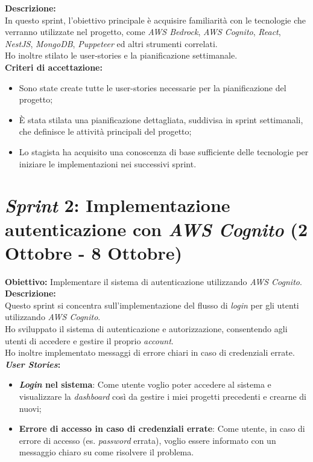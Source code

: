\noindent \textbf{Descrizione:}\\  
\noindent In questo \gls{sprint}, l'obiettivo principale è acquisire familiarità con le tecnologie che verranno utilizzate nel progetto, come \textit{AWS Bedrock}, \textit{AWS Cognito}, \textit{React}, \textit{NestJS}, \textit{MongoDB}, \textit{Puppeteer} ed altri strumenti correlati.\\
Ho inoltre stilato le \gls{user-stories} e la pianificazione settimanale.\\

\noindent \textbf{Criteri di accettazione:}  
\begin{itemize}
    \item Sono state create tutte le \gls{user-stories} necessarie per la pianificazione del progetto;
    \item È stata stilata una pianificazione dettagliata, suddivisa in \gls{sprint} settimanali, che definisce le attività principali del progetto;
    \item Lo stagista ha acquisito una conoscenza di base sufficiente delle tecnologie per iniziare le implementazioni nei successivi \gls{sprint}.
\end{itemize}
\section*{\textit{Sprint} 2: Implementazione autenticazione con \textit{AWS Cognito} (2 Ottobre - 8 Ottobre)}
\textbf{Obiettivo:} Implementare il sistema di autenticazione utilizzando \textit{AWS Cognito}.\\  

\noindent \textbf{Descrizione:}\\  
\noindent Questo \gls{sprint} si concentra sull'implementazione del flusso di \textit{login} per gli utenti utilizzando \textit{AWS Cognito}. \\
Ho sviluppato il sistema di autenticazione e autorizzazione, consentendo agli utenti di accedere e gestire il proprio \textit{account}. \\
Ho inoltre implementato messaggi di errore chiari in caso di credenziali errate.\\

\noindent \textbf{\textit{User Stories}:}  
\begin{itemize}
    \item \textbf{\textit{Login} nel sistema}: Come utente voglio poter accedere al sistema e visualizzare la \textit{dashboard} così da gestire i miei progetti precedenti e crearne di nuovi;
    \item \textbf{Errore di accesso in caso di credenziali errate}: Come utente, in caso di errore di accesso (es. \textit{password} errata), voglio essere informato con un messaggio chiaro su come risolvere il problema.
\end{itemize}

